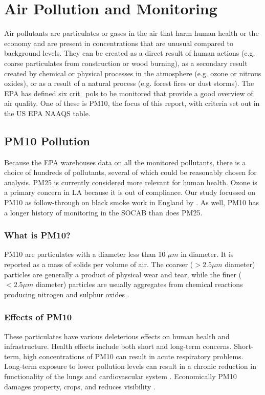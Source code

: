 \section{Air Pollution and Monitoring}\label{sec:introdairpollution}
Air pollutants are particulates or gases in the air that harm human health or the economy and are present in concentrations that are unusual compared to background levels.  They can be created as a direct result of human actions (e.g. coarse particulates from construction or wood burning), as a secondary result created by chemical or physical processes in the atmosphere (e.g. ozone or nitrous oxides), or as a result of a natural process (e.g. forest fires or dust storms).  The \ac{EPA} has defined six \glspl{crit_pol} to be monitored that provide a good overview of air quality.  One of these is \ac{PM10}, the focus of this report,  with criteria set out in the US EPA NAAQS table.

\subsection{PM10 Pollution}\label{sec:pm10}
Because the \ac{EPA} warehouses data on all the monitored pollutants, there is a choice of hundreds of pollutants, several of which could be reasonably chosen for analysis.  \ac{PM25} is currently considered more relevant for human health.  Ozone is a primary concern in LA because it is out of compliance.   Our study focussed on \ac{PM10} as follow-through on black smoke work in England by \cite{zidek2010monitoring}.  As well, \ac{PM10} has a longer history of monitoring in the \ac{SOCAB} than does \ac{PM25}.

\subsubsection{What is PM10?}
\label{subsubsec:pm10nature}
\ac{PM10} are particulates with a diameter less than 10 $\mu m$ in diameter.  It is reported as a mass of solids per volume of air.  The coarser ($> 2.5 \mu m$ diameter) particles are generally a product of physical wear and tear, while the finer ($< 2.5 \mu m$ diameter) particles are usually aggregates from chemical reactions producing nitrogen and sulphur oxides
.

\subsubsection{Effects of PM10}
\label{subsubsec:pm10effects}
These particulates have various deleterious effects on human health and infrastructure.  Health effects include both short and long-term concerns.  Short-term, high concentrations of \ac{PM10} can result in acute respiratory problems.  Long-term exposure to lower pollution levels can result in a chronic reduction in functionality of the lungs and cardiovascular system %
.  Economically \ac{PM10} damages property, crops, and reduces visibility
.


